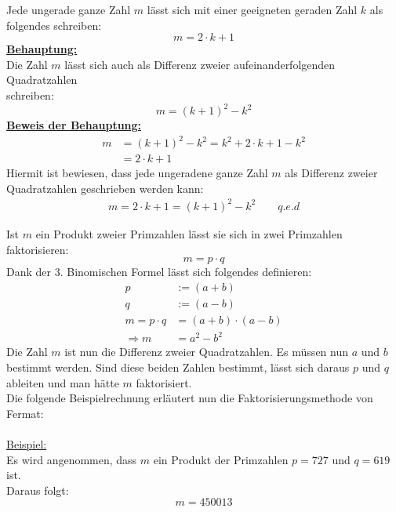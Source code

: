 \begin{Faktorisierung}
Jede ungerade ganze Zahl $m$ lässt sich mit einer geeigneten geraden Zahl $k$ als\\
folgendes schreiben:
\begin{equation*}
m=2\cdot k+1
\end{equation*}
\textbf{\underline{Behauptung:}}\\
Die Zahl $m$ lässt sich auch als Differenz zweier aufeinanderfolgenden Quadratzahlen\\ schreiben:
\begin{equation*}
m=(k+1)^{2}-k^{2}
\end{equation*}
\textbf{\underline{Beweis der Behauptung:}}
\begin{align*}
m&=(k+1)^{2}-k^{2} = k^{2}+2\cdot k+1-k^{2}\\
&=2\cdot k+1
\end{align*}
Hiermit ist bewiesen, dass jede ungeradene ganze Zahl $m$ als Differenz zweier Quadratzahlen geschrieben werden kann:
\begin{align*}
m=2\cdot k+1=(k+1)^{2}-k^{2} \qquad q.e.d
\end{align*}
\end{Faktorisierung}
Ist $m$ ein Produkt zweier Primzahlen lässt sie sich in zwei Primzahlen faktorisieren:
\begin{equation*}
m=p\cdot q
\end{equation*}
Dank der 3. Binomischen Formel lässt sich folgendes definieren:
\begin{align*}
\label{eq:3_bin_formel_Definition}
p&:=(a+b)\\
q&:=(a-b)\\
m=p\cdot q&=(a+b)\cdot(a-b)\\
\Rightarrow m&=a^{2}-b^{2}
\end{align*}
Die Zahl $m$ ist nun die Differenz zweier Quadratzahlen. Es müssen nun $a$ und $b$ bestimmt werden. Sind diese beiden Zahlen bestimmt, lässt sich daraus $p$ und $q$ ableiten und man hätte $m$ faktorisiert.\\
Die folgende Beispielrechnung erläutert nun die Faktorisierungsmethode von Fermat:\\
\\
\underline{Beispiel:}\\
Es wird angenommen, dass $m$ ein Produkt der Primzahlen $p=727$ und $q=619$ ist.\\
Daraus folgt:
\begin{equation*}
m=450013
\end{equation*}
